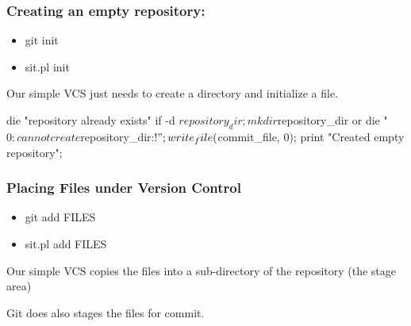 \begin{frame}[fragile]
\frametitle{Creating an empty repository:}
\begin{itemize}
\item  git init
\item  sit.pl init
\end{itemize}

Our simple VCS just needs to create a directory and initialize a file.

\begin{small}
\begin{perl}
die "repository already exists\n" if -d $repository_dir;
mkdir $repository_dir or
    die "$0: can not create $repository_dir:$!";
write_file($commit_file, 0);
print "Created empty repository\n";
\end{perl}
\end{small}
\end{frame}

\begin{frame}[fragile]
\frametitle{Placing Files under Version Control}
\begin{itemize}
\item  git add FILES
\item  sit.pl add FILES
\end{itemize}

Our simple VCS copies the files into a sub-directory of the repository (the stage area)

Git does also stages the files for commit.

\begin{small}
\end{small}
\end{frame}

